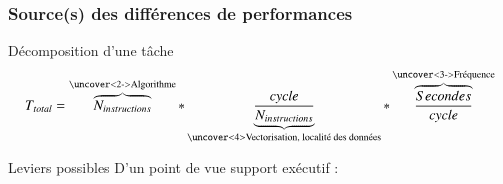 \documentclass[xcolor={usenames,dvipsnames,svgnames,table}, aspectratio=43]{beamer}
\begin{document}
\begin{frame}
  \frametitle{Source(s) des différences de performances}

  \begin{block}{Décomposition d'une tâche}
    $$ T_{total} = \overbrace{N_{instructions}}^\text{\uncover<2->{Algorithme}} * \underbrace{\frac{cycle}{N_{instructions}}}_\text{\uncover<4>{Vectorisation, localité des données}} * \overbrace{\frac{Secondes}{cycle}}^\text{\uncover<3->{Fréquence}} $$
  \end{block}

  \begin{block}{Leviers possibles}
    D'un point de vue support exécutif :
    \begin{itemize}
    \end{itemize}
  \end{block}

\end{frame}
\end{document}
